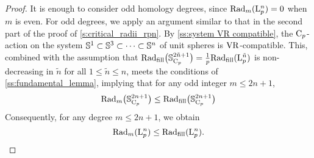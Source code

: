 \begin{proof}
    It is enough to consider odd homology degrees, since $\mathrm{Rad}_{m}(\mathrm{L}^n_p) = 0$ when $m$ is even.
    For odd degrees, we apply an argument similar to that in the second part of the proof of \cref{s:critical_radii_rpn}.
    By \cref{ss:system VR compatible}, the $\mathrm{C}_p$-action on the system $\mathbb{S}^1 \subset \mathbb{S}^3 \subset \dotsb \subset \mathbb{S}^n$ of unit spheres is \(\mathrm{VR}\)-compatible.
    This, combined with the assumption that $\mathrm{Rad}_{\mathrm{fill}}\big(\mathbb{S}^{2\tilde{n}+1}_{\mathrm{C}_p}\big) = \tfrac{1}{p} \mathrm{Rad}_{\mathrm{fill}}(\mathrm{L}^{\tilde{n}}_p)$ is non-decreasing in $\tilde{n}$ for all $1\leq \tilde{n} \leq n$, meets the conditions of \cref{ss:fundamental_lemma}, implying that for any odd integer $m \leq 2n+1$,
    \[
    \mathrm{Rad}_m\big(\mathbb{S}^{2n+1}_{\mathrm{C}_p}\big) \leq \mathrm{Rad}_{\mathrm{fill}}\big(\mathbb{S}^{2n+1}_{\mathrm{C}_p}\big)
    \]
    Consequently, for any degree $m \leq 2n+1$, we obtain
    \[
    \firstdeath{m}{\rL^n_p} \leq \fillrad(\rL^n_p). %
    \qedhere
    \]
\end{proof}